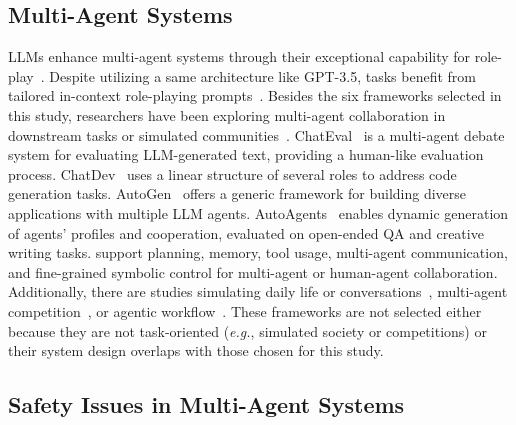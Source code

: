 \documentclass{article}
\theoremstyle{plain}
\theoremstyle{definition}
\theoremstyle{remark}
\newcommand{\eg}{\textit{e.g.}}
\begin{document}
\subsection{Multi-Agent Systems}

LLMs enhance multi-agent systems through their exceptional capability for role-play~\cite{wang2024incharacter}.
Despite utilizing a same architecture like GPT-3.5, tasks benefit from tailored in-context role-playing prompts~\cite{min2022rethinking}.
Besides the six frameworks selected in this study, researchers have been exploring multi-agent collaboration in downstream tasks or simulated communities~\cite{tran2025multi, zhang2025g, zhang2025multi}.
ChatEval~\cite{chan2023chateval} is a multi-agent debate system for evaluating LLM-generated text, providing a human-like evaluation process.
ChatDev~\cite{qian2023communicative} uses a linear structure of several roles to address code generation tasks.
AutoGen~\cite{wu2023autogen} offers a generic framework for building diverse applications with multiple LLM agents.
AutoAgents~\cite{chen2023autoagents} enables dynamic generation of agents' profiles and cooperation, evaluated on open-ended QA and creative writing tasks.
\citet{zhou2023agents} support planning, memory, tool usage, multi-agent communication, and fine-grained symbolic control for multi-agent or human-agent collaboration.
Additionally, there are studies simulating daily life or conversations~\cite{park2023generative, zhou2023sotopia, yang2024oasis}, multi-agent competition~\cite{huang2024far, liu2024interintent, liang2023leveraging}, or agentic workflow~\cite{qian2025scaling, zhuge2024gptswarm}.
These frameworks are not selected either because they are not task-oriented (\eg, simulated society or competitions) or their system design overlaps with those chosen for this study.

\subsection{Safety Issues in Multi-Agent Systems}
\end{document}
